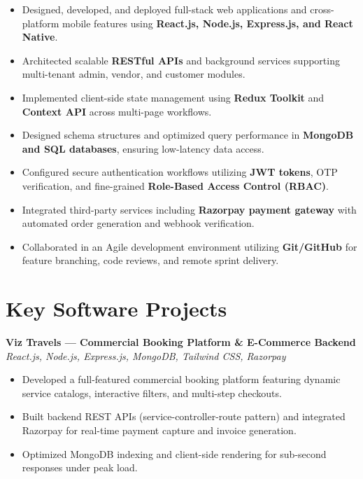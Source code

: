 \documentclass[a4paper,10pt]{article}
\begin{document}
\begin{itemize}

    \item Designed, developed, and deployed full-stack web applications and cross-platform mobile features using \textbf{React.js, Node.js, Express.js, and React Native}.

    \item Architected scalable \textbf{RESTful APIs} and background services supporting multi-tenant admin, vendor, and customer modules.

    \item Implemented client-side state management using \textbf{Redux Toolkit} and \textbf{Context API} across multi-page workflows.

    \item Designed schema structures and optimized query performance in \textbf{MongoDB and SQL databases}, ensuring low-latency data access.

    \item Configured secure authentication workflows utilizing \textbf{JWT tokens}, OTP verification, and fine-grained \textbf{Role-Based Access Control (RBAC)}.

    \item Integrated third-party services including \textbf{Razorpay payment gateway} with automated order generation and webhook verification.

    \item Collaborated in an Agile development environment utilizing \textbf{Git/GitHub} for feature branching, code reviews, and remote sprint delivery.

\end{itemize}

\section*{Key Software Projects}

\textbf{Viz Travels --- Commercial Booking Platform \& E-Commerce Backend}
\hfill
\textit{React.js, Node.js, Express.js, MongoDB, Tailwind CSS, Razorpay}

\begin{itemize}

    \item Developed a full-featured commercial booking platform featuring dynamic service catalogs, interactive filters, and multi-step checkouts.

    \item Built backend REST APIs (service-controller-route pattern) and integrated Razorpay for real-time payment capture and invoice generation.

    \item Optimized MongoDB indexing and client-side rendering for sub-second responses under peak load.

\end{itemize}
\end{document}
